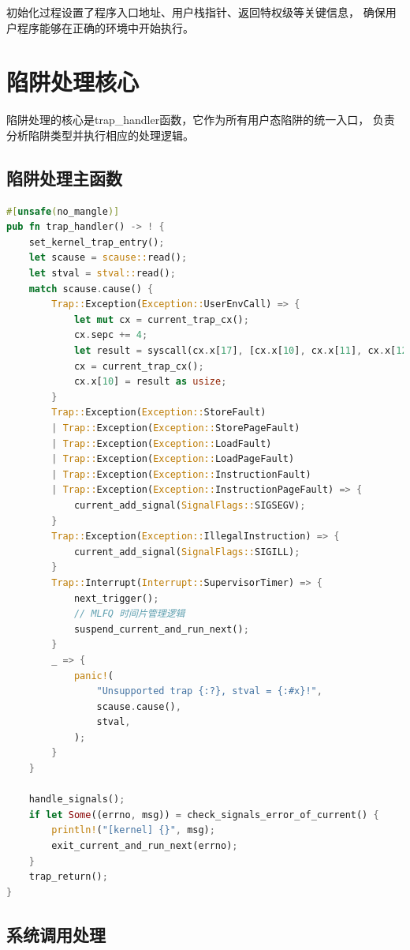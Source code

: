 初始化过程设置了程序入口地址、用户栈指针、返回特权级等关键信息，
确保用户程序能够在正确的环境中开始执行。

\section{陷阱处理核心}

陷阱处理的核心是trap\_handler函数，它作为所有用户态陷阱的统一入口，
负责分析陷阱类型并执行相应的处理逻辑。

\subsection{陷阱处理主函数}

\begin{lstlisting}[language=Rust,caption={陷阱处理主函数}, label={lst:trap-handler}]
#[unsafe(no_mangle)]
pub fn trap_handler() -> ! {
    set_kernel_trap_entry();
    let scause = scause::read();
    let stval = stval::read();
    match scause.cause() {
        Trap::Exception(Exception::UserEnvCall) => {
            let mut cx = current_trap_cx();
            cx.sepc += 4;
            let result = syscall(cx.x[17], [cx.x[10], cx.x[11], cx.x[12]]);
            cx = current_trap_cx();
            cx.x[10] = result as usize;
        }
        Trap::Exception(Exception::StoreFault)
        | Trap::Exception(Exception::StorePageFault)
        | Trap::Exception(Exception::LoadFault)
        | Trap::Exception(Exception::LoadPageFault)
        | Trap::Exception(Exception::InstructionFault)
        | Trap::Exception(Exception::InstructionPageFault) => {
            current_add_signal(SignalFlags::SIGSEGV);
        }
        Trap::Exception(Exception::IllegalInstruction) => {
            current_add_signal(SignalFlags::SIGILL);
        }
        Trap::Interrupt(Interrupt::SupervisorTimer) => {
            next_trigger();
            // MLFQ 时间片管理逻辑
            suspend_current_and_run_next();
        }
        _ => {
            panic!(
                "Unsupported trap {:?}, stval = {:#x}!",
                scause.cause(),
                stval,
            );
        }
    }

    handle_signals();
    if let Some((errno, msg)) = check_signals_error_of_current() {
        println!("[kernel] {}", msg);
        exit_current_and_run_next(errno);
    }
    trap_return();
}
\end{lstlisting}

\subsection{系统调用处理}

